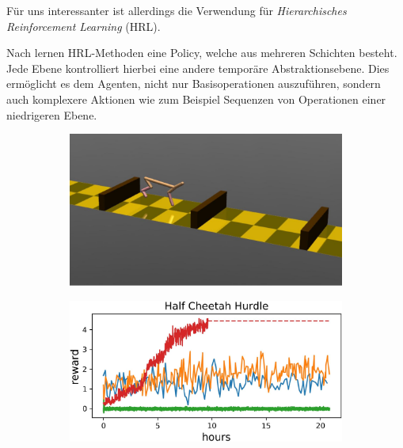 \smallspace

Für uns interessanter ist allerdings die Verwendung für \textit{Hierarchisches Reinforcement Learning} (HRL). 

Nach \cite{BerliacHierachialRL2019} lernen HRL-Methoden eine Policy, welche aus mehreren Schichten besteht. Jede Ebene kontrolliert hierbei eine andere temporäre Abstraktionsebene. Dies ermöglicht es dem Agenten, nicht nur Basisoperationen auszuführen, sondern auch komplexere Aktionen wie zum Beispiel Sequenzen von Operationen einer niedrigeren Ebene.

\smallspace

\begin{figure}[h]
\begin{subfigure}{0.38\textwidth}
\includegraphics[width=\textwidth, keepaspectratio=true]{images/cheetah_hurdle_image.JPG}
\caption{} \label{img:cheetah_hurdle_img}
\end{subfigure}
\begin{subfigure}{0.4\textwidth}
\includegraphics[width=\textwidth, keepaspectratio=true]{images/cheetah_hurdle.JPG}
\caption{} \label{img:cheetah_hurdle_graph}
\end{subfigure}

\end{figure}
